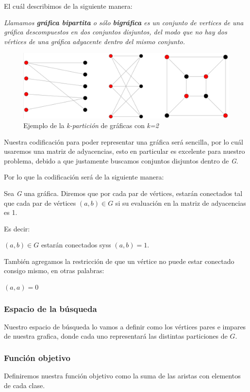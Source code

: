 \documentclass{article}
\begin{document}
El cuál describimos de la siguiente manera:

\textit{Llamamos \textbf{gráfica bipartita} o sólo \textbf{bigráfica} es un conjunto de vertices de una gráfica descompuestos en dos conjuntos disjuntos, del modo que no hay dos vértices de una gráfica adyacente dentro del mismo conjunto.}

\begin{figure}[h]
\begin{center}
\includegraphics[scale=0.25]{./img/bigrafica}
\caption{Ejemplo de la \textit{k-partición} de gráficas con \textit{k=2}}
\end{center}
\end{figure}

Nuestra codificación para poder representar una gráfica será 
sencilla, por lo cuál usaremos una matriz de adyacencias, esto en
particular es excelente para nuestro problema, debido a que 
justamente buscamos conjuntos disjuntos dentro de \textit{G}.

Por lo que la codificación será de la siguiente manera:

Sea \textit{G} una gráfica. Diremos que por cada par de vértices, estarán
conectados tal que cada par de vértices $(a,b) \in G$ si su 
evaluación en la matriz de adyacencias es 1.

Es decir:

$(a,b) \in G$ estarán conectados syss $(a,b)=1$.

También agregamos la restricción de que un vértice no puede estar
conectado consigo mismo, en otras palabras:

$(a,a)=0$

\subsubsection*{Espacio de la búsqueda}

Nuestro espacio de búsqueda lo vamos a definir como los vértices 
pares e impares de nuestra grafica, donde cada uno representará
las distintas particiones de $G$.

\subsubsection*{Función objetivo}
Definiremos nuestra función objetivo como la suma de las aristas con
elementos de cada clase.
\end{document}
